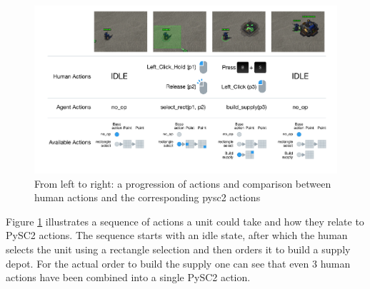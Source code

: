 \begin{figure}[htb]
  \centering
      \includegraphics[width=1\textwidth]{Figures/sc2le/sc2le_actions.png}
  \caption{From left to right: a progression of actions and comparison between human actions and the corresponding pysc2 actions \citep{DBLP:journals/corr/dmsc2} }
  \label{fig:pysc2_actions}
\end{figure}
Figure \ref{fig:pysc2_actions} illustrates a sequence of actions a unit could take and how they relate to PySC2 actions. The sequence starts with an idle state, after which the human selects the unit using a rectangle selection and then orders it to build a supply depot. For the actual order to build the supply one can see that even 3 human actions have been combined into a single PySC2 action.


